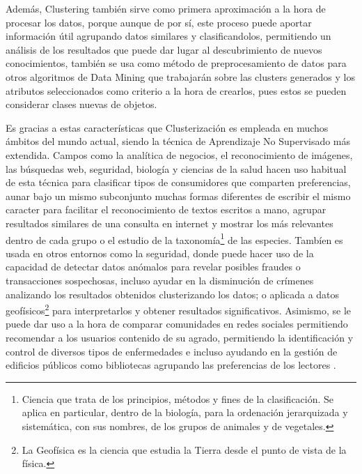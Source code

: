 \documentclass[3p,twocolumn]{elsarticle}
\begin{document}
Además, Clustering también sirve como primera aproximación a la hora de procesar los datos, porque aunque de por sí, este proceso puede aportar información útil agrupando datos similares y clasificandolos, permitiendo un análisis de los resultados que puede dar lugar al descubrimiento de nuevos conocimientos, también se usa como método de preprocesamiento de datos para otros algoritmos de Data Mining que trabajarán sobre las clusters generados y los atributos seleccionados como criterio a la hora de crearlos, pues estos se pueden considerar clases nuevas de objetos.

Es gracias a estas características que Clusterización es empleada en muchos ámbitos del mundo actual, siendo la técnica de Aprendizaje No Supervisado más extendida. Campos como la analítica de negocios, el reconocimiento de imágenes, las búsquedas web, seguridad, biología y ciencias de la salud hacen uso habitual de esta técnica para clasificar tipos de consumidores que comparten preferencias, aunar bajo un mismo subconjunto muchas formas diferentes de escribir el mismo caracter para facilitar el reconocimiento de textos escritos a mano, agrupar resultados similares de una consulta en internet y mostrar los más relevantes dentro de cada grupo o el estudio de la taxonomía\footnote{Ciencia que trata de los principios, métodos y fines de la clasificación. Se aplica en particular, dentro de la biología, para la ordenación jerarquizada y sistemática, con sus nombres, de los grupos de animales y de vegetales.} de las especies. Tambíen es usada en otros entornos como la seguridad, donde puede hacer uso de la capacidad de detectar datos anómalos para revelar posibles fraudes o transacciones sospechosas, incluso ayudar en la disminución de crímenes analizando los resultados obtenidos clusterizando los datos; o aplicada a datos geofísicos\footnote{La Geofísica es la ciencia que estudia la Tierra desde el punto de vista de la física.} para interpretarlos y obtener resultados significativos. Asimismo, se le puede dar uso a la hora de comparar comunidades en redes sociales permitiendo recomendar a los usuarios contenido de su agrado, permitiendo la identificación y control de diversos tipos de enfermedades e incluso ayudando en la gestión de edificios públicos como bibliotecas agrupando las preferencias de los lectores \cite{9,10,11,12,13}.


\end{document}
